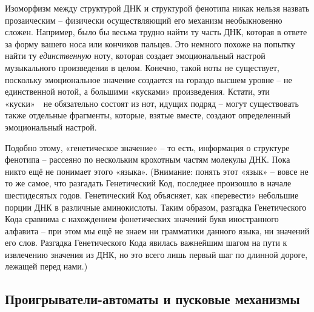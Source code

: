 \documentclass[../main.tex]{subfiles}
\begin{document}
Изоморфизм между структурой ДНК и структурой фенотипа никак нельзя назвать прозаическим \--- физически осуществляющий его механизм необыкновенно сложен. Например, было бы весьма трудно найти ту часть ДНК, которая в ответе за форму вашего носа или кончиков пальцев. Это немного похоже на попытку найти ту \emph{единственную} ноту, которая создает эмоциональный настрой музыкального произведения в целом. Конечно, такой ноты не существует, поскольку эмоциональное значение создается на гораздо высшем уровне \--- не единственной нотой, а большими «кусками» произведения. Кстати, эти «куски»~~не обязательно состоят из нот, идущих подряд \--- могут существовать также отдельные фрагменты, которые, взятые вместе, создают определенный эмоциональный настрой.

Подобно этому, «генетическое значение» \--- то есть, информация о структуре фенотипа \--- рассеяно по нескольким крохотным частям молекулы ДНК\@. Пока никто ещё не понимает этого «языка». (Внимание: понять этот «язык» \--- вовсе не то же самое, что разгадать Генетический Код, последнее произошло в начале шестидесятых годов. Генетический Код объясняет, как «перевести» небольшие порции ДНК в различные аминокислоты. Таким образом, разгадка Генетического Кода сравнима с нахождением фонетических значений букв иностранного алфавита \--- при этом мы ещё не знаем ни грамматики данного языка, ни значений его слов. Разгадка Генетического Кода явилась важнейшим шагом на пути к извлечению значения из ДНК, но это всего лишь первый шаг по длинной дороге, лежащей перед нами.)


\subsection{Проигрыватели-автоматы и пусковые механизмы}
\end{document}
